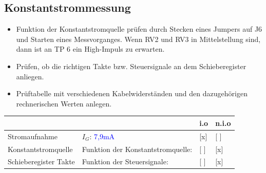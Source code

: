 
\newpage
\subsection{Konstantstrommessung}


\begin{itemize}
	\item{Funktion der Konstantstromquelle prüfen durch Stecken eines Jumpers auf J6 und Starten eines Messvorganges. Wenn RV2 und RV3 in Mittelstellung sind, dann ist an TP 6 ein High-Impuls zu erwarten.}
	
	\item{Prüfen, ob die richtigen Takte bzw. Steuersignale an dem Schieberegister anliegen.}
	
	\item{Prüftabelle mit verschiedenen Kabelwiderständen und den dazugehörigen rechnerischen Werten anlegen.}
\end{itemize}


\renewcommand{\arraystretch}{2}
\begin{tabularx}{\textwidth}{p{}| p{} | p{} | p{}}

 &  & i.o & n.i.o \\

\hline

Stromaufnahme & $I_{G}$: \textcolor{blue}{7,9mA} & [x] & [ ] \\

\hline

Konstantstromquelle & Funktion der Konstantstromquelle: 	& [ ] & [x] \\

\hline

Schieberegister Takte & Funktion der Steuersignale: 		& [ ] & [x] \\
		
\end{tabularx}
\renewcommand{\arraystretch}{1}

